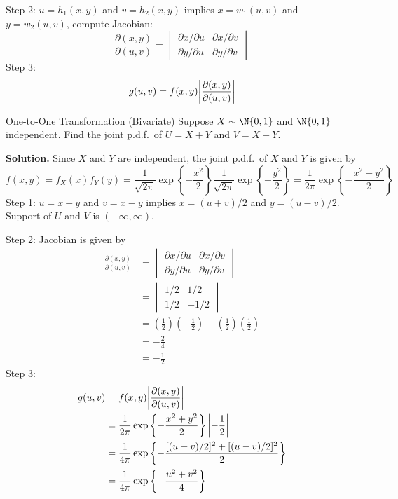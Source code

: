 Step 2: $ u=h_1(x,y) $ and $ v=h_2(x,y) $ implies
$ x=w_1(u,v) $ and $ y=w_2(u,v) $, compute Jacobian:
\[ \frac{\partial(x,y)}{\partial(u,v)}=\begin{vmatrix}
        \partial x/\partial u & \partial x/\partial v \\
        \partial y/\partial u & \partial y/\partial v
    \end{vmatrix} \]
Step 3:
\[ g(u,v)=f(x,y)\abs*{\frac{\partial(x,y)}{\partial(u,v)} } \]
\begin{Example}{One-to-One Transformation (Bivariate)}{}
    Suppose $ X \sim \N{0,1} $ and $ \N{0,1} $ independent.
    Find the joint p.d.f.\ of $ U=X+Y $ and $ V=X-Y $.

    \textbf{Solution.} Since $ X $ and $ Y $ are independent,
    the joint p.d.f.\ of $ X $ and $ Y $ is given by
    \[ f(x,y)=f_X(x)f_Y(y)=\frac{1}{\sqrt{2\pi}}\exp\left\{ -\frac{x^2}{2}\right\}
        \frac{1}{\sqrt{2\pi}}\exp\left\{ -\frac{y^2}{2}\right\}=
        \frac{1}{2\pi}\exp\left\{ -\frac{x^2+y^2}{2} \right\}  \]
    Step 1: $ u=x+y $ and $ v=x-y $ implies $ x=(u+v)/2 $
    and $ y=(u-v)/2 $. Support of $ U $ and $ V $ is $ (-\infty,\infty) $.

    Step 2: Jacobian is given by
    \begin{align*}
        \frac{\partial(x,y)}{\partial(u,v)}
         & =\begin{vmatrix}
            \partial x/\partial u & \partial x/\partial v \\
            \partial y/\partial u & \partial y/\partial v
        \end{vmatrix}                             \\
         & =\begin{vmatrix}
            1/2 & 1/2  \\
            1/2 & -1/2
        \end{vmatrix}                             \\
         & =\left( \frac{1}{2} \right)\left( -\frac{1}{2} \right)
        -\left( \frac{1}{2} \right)\left( \frac{1}{2} \right)     \\
         & =-\frac{2}{4}                                          \\
         & =-\frac{1}{2}
    \end{align*}
    Step 3:
    \begin{align*}
        g(u,v)
         & =f(x,y)\abs*{\frac{\partial(x,y)}{\partial(u,v)}}                        \\
         & =\frac{1}{2\pi}\exp\left\{ -\frac{x^2+y^2}{2}\right\}\abs*{-\frac{1}{2}} \\
         & =\frac{1}{4\pi}\exp\left\{ -\frac{[(u+v)/2]^2+[(u-v)/2]^2}{2} \right\}   \\
         & =\frac{1}{4\pi}\exp\left\{ -\frac{u^2+v^2}{4} \right\}
    \end{align*}
\end{Example}
